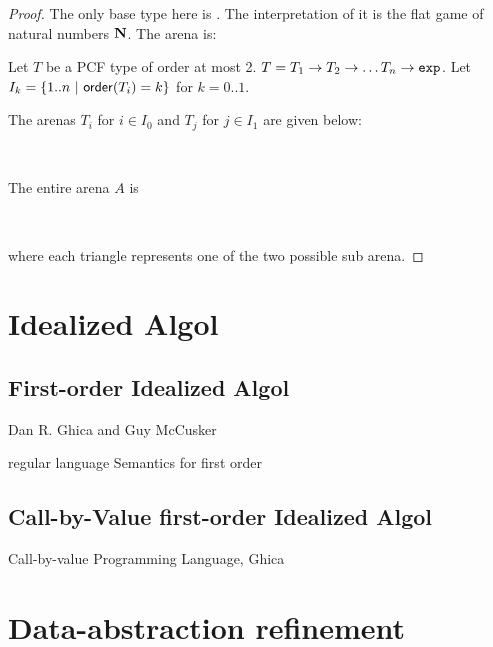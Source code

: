 \begin{proof}
The only base type here is \typexp. The interpretation of it is the
flat game of natural numbers $\mathbf{N}$. The arena is:
\begin{center}
    {   \TR{\ldots}
    }
\end{center}

Let $T$ be a PCF type of order at most 2. $T = T_1 \rightarrow T_2
\rightarrow \ldots T_n \rightarrow \texttt{exp}$. Let $I_k = \{ 1.. n\ |\
{\sf order}(T_i) = k \}$ for $k = 0..1$.

The arenas $T_i$ for $i \in I_0$ and $T_j$ for $j \in I_1$ are given
below:
\begin{center}
\
    {   \TR{\ldots} }
\hspace{2cm}
    {
        {   \TR{\ldots} }
      \TR{$1'_j$}  \TR{\ldots}
    }
\end{center}

The entire arena $A$ is
\newcommand{\SubTree}[2][]{\Tr[ref=t]{\pstribox[#1]{#2}}}
\begin{center}
\
    {
\SubTree{$T_1$} \SubTree[linestyle=dashed]{$T_i$} \SubTree{$T_n$}
    \TR{1} \TR{2} \TR{\ldots} }
\end{center}

where each triangle represents one of the two possible sub arena.



\end{proof}


\section{Idealized Algol}
\label{sec:ia}

\subsection{First-order Idealized Algol}

Dan R. Ghica and Guy McCusker

 regular language Semantics for first order

\subsection{Call-by-Value first-order Idealized Algol}

Call-by-value Programming Language, Ghica


\section{Data-abstraction refinement}


